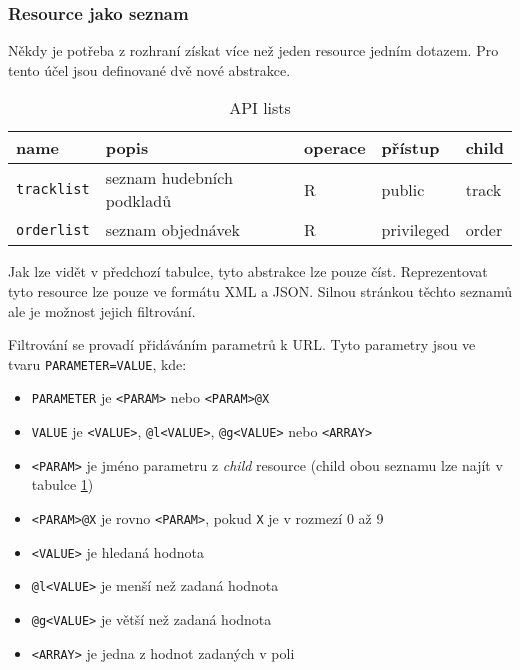\documentclass[12pt]{article}
\begin{document}
\subsubsection{Resource jako seznam}\label{api:lists}

Někdy je potřeba z rozhraní získat více než jeden resource jedním dotazem. Pro tento účel jsou definované dvě nové abstrakce.

\begin{table}[ht]
\begin{center}
  \begin{tabular}{ | l | p{5cm} | l | l | l |} \hline
    name & popis & operace & přístup & child \\ \hline\hline
    \texttt{tracklist} & seznam hudebních podkladů & R & public & track \\ \hline
    \texttt{orderlist} & seznam objednávek & R & privileged & order \\ \hline
  \end{tabular}
  \caption{API lists} \label{api:tablists}
\end{center}
\end{table}

Jak lze vidět v předchozí tabulce, tyto abstrakce lze pouze číst. Reprezentovat tyto resource lze pouze ve formátu XML a JSON. Silnou stránkou těchto seznamů ale je možnost jejich filtrování.

Filtrování se provadí přidáváním parametrů k URL. Tyto parametry jsou ve tvaru \texttt{PARAMETER=VALUE}, kde:

\begin{itemize}
\item{\verb|PARAMETER|} je \verb|<PARAM>| nebo \verb|<PARAM>@X|
\item{\verb|VALUE|} je \verb|<VALUE>|, \verb|@l<VALUE>|, \verb|@g<VALUE>| nebo \verb|<ARRAY>|
\item{\verb|<PARAM>|} je jméno parametru z \emph{child} resource (child obou seznamu lze najít v tabulce \ref{api:tablists})
\item{\verb|<PARAM>@X|} je rovno \verb|<PARAM>|, pokud \verb|X| je v rozmezí 0 až 9
\item{\verb|<VALUE>|} je hledaná hodnota
\item{\verb|@l<VALUE>|} je menší než zadaná hodnota
\item{\verb|@g<VALUE>|} je větší než zadaná hodnota
\item{\verb|<ARRAY>|} je jedna z hodnot zadaných v poli
\end{itemize}
\end{document}
